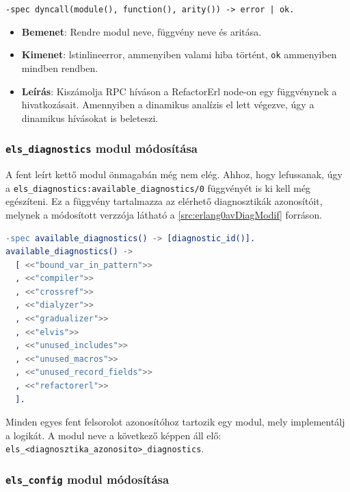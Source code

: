     
    
    \noindent \lstinline{-spec dyncall(module(), function(), arity()) -> error | ok.}
    \begin{itemize}
            \item \textbf{Bemenet}: Rendre modul neve, függvény neve és aritása.
            \item \textbf{Kimenet}:  lstinline{error}, ammenyiben valami hiba történt, \lstinline{ok} ammenyiben mindben rendben.
            \item \textbf{Leírás}: Kiszámolja RPC híváson a RefactorErl node-on egy függvénynek a hivatkozásait. Amennyiben a dinamikus analízis el lett végezve, úgy a dinamikus hívásokat is beleteszi.
        \end{itemize}





\subsubsection{\lstinline{els_diagnostics} modul módosítása}

A fent leírt kettő modul önmagabán még nem elég. Ahhoz, hogy lefussanak, úgy a \lstinline{els_diagnostics:available_diagnostics/0} függvényét is ki kell még egészíteni. Ez a függvény tartalmazza az elérhető diagnosztikák azonosítóit, melynek a módosított verzzója látható a \ref{src:erlang0avDiagModif} forráson.

\begin{lstlisting}[language={erlang}]
-spec available_diagnostics() -> [diagnostic_id()].
available_diagnostics() ->
  [ <<"bound_var_in_pattern">>
  , <<"compiler">>
  , <<"crossref">>
  , <<"dialyzer">>
  , <<"gradualizer">>
  , <<"elvis">>
  , <<"unused_includes">>
  , <<"unused_macros">>
  , <<"unused_record_fields">>
  , <<"refactorerl">>
  ].
 \end{lstlisting}
 
Minden egyes fent felsorolot azonosítóhoz tartozik egy modul, mely implementálj a logikát. A modul neve a következő képpen áll elő: \lstinline{els_<diagnosztika_azonosito>_diagnostics}.
\\
\subsubsection{\lstinline{els_config} modul módosítása}

